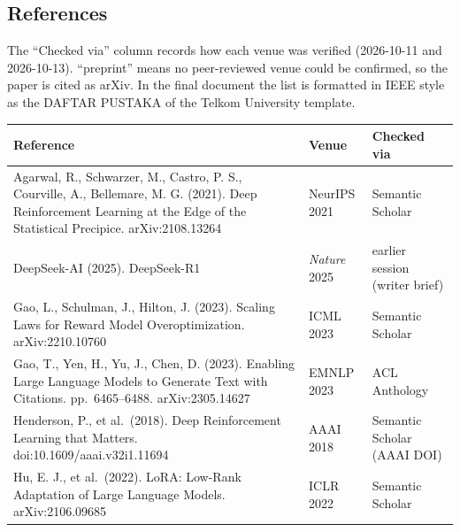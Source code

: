 \subsection{References}\label{references}

The ``Checked via'' column records how each venue was verified
(2026-10-11 and 2026-10-13). ``preprint'' means no peer-reviewed venue
could be confirmed, so the paper is cited as arXiv. In the final
document the list is formatted in IEEE style as the DAFTAR PUSTAKA of
the Telkom University template.

{\def\LTcaptype{none} %
\begin{longtable}[]{@{}
  >{\raggedright\arraybackslash}p{}
  >{\raggedright\arraybackslash}p{}
  >{\raggedright\arraybackslash}p{}@{}}
\toprule\noalign{}
\begin{minipage}[b]{\linewidth}\raggedright
Reference
\end{minipage} & \begin{minipage}[b]{\linewidth}\raggedright
Venue
\end{minipage} & \begin{minipage}[b]{\linewidth}\raggedright
Checked via
\end{minipage} \\
\midrule\noalign{}
\endhead
\bottomrule\noalign{}
\endlastfoot
Agarwal, R., Schwarzer, M., Castro, P. S., Courville, A., Bellemare, M.
G. (2021). Deep Reinforcement Learning at the Edge of the Statistical
Precipice. arXiv:2108.13264 & NeurIPS 2021 & Semantic Scholar \\
DeepSeek-AI (2025). DeepSeek-R1 & \emph{Nature} 2025 & earlier session
(writer brief) \\
Gao, L., Schulman, J., Hilton, J. (2023). Scaling Laws for Reward Model
Overoptimization. arXiv:2210.10760 & ICML 2023 & Semantic Scholar \\
Gao, T., Yen, H., Yu, J., Chen, D. (2023). Enabling Large Language
Models to Generate Text with Citations. pp.~6465--6488. arXiv:2305.14627
& EMNLP 2023 & ACL Anthology \\
Henderson, P., et al.~(2018). Deep Reinforcement Learning that Matters.
doi:10.1609/aaai.v32i1.11694 & AAAI 2018 & Semantic Scholar (AAAI
DOI) \\
Hu, E. J., et al.~(2022). LoRA: Low-Rank Adaptation of Large Language
Models. arXiv:2106.09685 & ICLR 2022 & Semantic Scholar \\

\end{longtable}}
